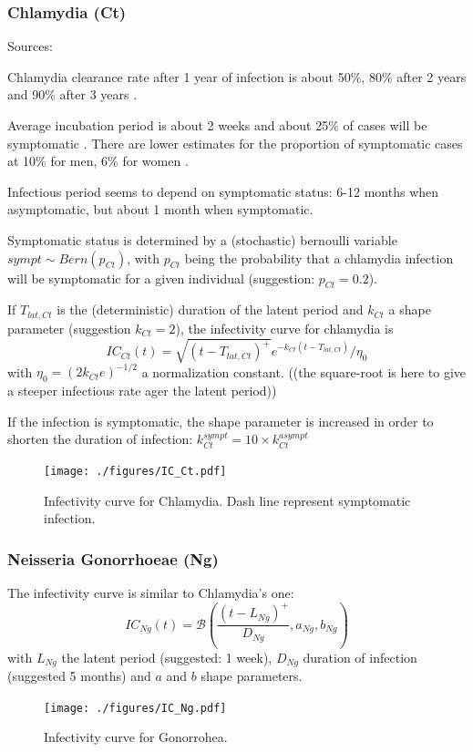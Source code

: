 \documentclass[11pt, onecolumn]{article}
\begin{document}
\subsubsection{Chlamydia (Ct)}

Sources: \cite{Geisler:2010bc, Althaus:2011dc}

Chlamydia clearance rate after 1 year of infection is about 50\%, 80\% after 2 years and 90\% after 3 years \cite{Geisler:2010bc}.

Average incubation period is about 2 weeks and about 25\% of cases will be symptomatic \cite{Althaus:2011dc}. There are lower estimates for the proportion of symptomatic cases at 10\% for men, 6\% for women \cite{Kretzschmar:1996ur}.

Infectious period seems to depend on symptomatic status: 6-12 months when asymptomatic, but about 1 month when symptomatic\cite{Kretzschmar:1996ur}.

Symptomatic status is determined by a (stochastic) bernoulli variable $sympt\sim Bern(p_{Ct})$, with $p_{Ct}$ being the probability that a chlamydia infection will be symptomatic for a given individual (suggestion: $p_{Ct}=0.2$).

If $T_{lat,Ct}$ is the (deterministic) duration of the latent period and $k_{Ct}$ a shape parameter (suggestion $k_{Ct}=2$), the infectivity curve for chlamydia is
$$IC_{Ct}(t) = \sqrt{(t-T_{lat,Ct})^+}e^{-k_{Ct} (t-T_{lat,Ct})}/\eta_0$$
with $\eta_0=(2k_{Ct}e)^{-1/2}$ a normalization constant. ((the square-root is here to give a steeper infectious rate ager the latent period))

If the infection is symptomatic, the shape parameter is increased in order to shorten the duration of infection: $k_{Ct}^{sympt} =10\times k_{Ct}^{asympt}$

\begin{figure}[!ht]
\centering
    \texttt{[image: ./figures/IC\_Ct.pdf]}
\caption{Infectivity curve for Chlamydia. Dash line represent symptomatic infection.}
\label{fig:ICCt}
\end{figure}



\subsubsection{Neisseria Gonorrhoeae (Ng)}


 
 The infectivity curve is similar to Chlamydia's one:
$$IC_{Ng}(t) = \mathcal{B}\left(\frac{(t-L_{Ng})^+}{D_{Ng}},a_{Ng},b_{Ng}\right)$$
with $L_{Ng}$ the latent period (suggested: 1 week), $D_{Ng}$ duration of infection (suggested 5 months) and $a$ and $b$ shape parameters.
\begin{figure}[!ht]
\centering
    \texttt{[image: ./figures/IC\_Ng.pdf]}
\caption{Infectivity curve for Gonorrohea.}
\label{fig:ICNg}
\end{figure} 
\end{document}
